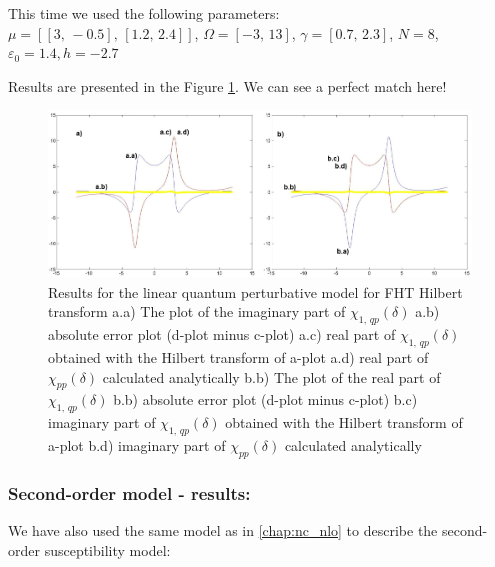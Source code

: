 \documentclass[12pt,twoside,a4paper]{article}
\numberwithin{equation}{subsection}
\numberwithin{figure}{subsection}
\begin{document}
This time we used the following parameters: \\
$\mu = [[3, \, - 0.5], \,[1.2, \,2.4]]$, 
$\Omega =[ - 3, \,13]$, 
$\gamma =[0.7, \,2.3]$,  
$N=8$, 
${\varepsilon_{0}}=1.4, 
h= - 2.7$

Results are presented in the Figure \ref{fig:fht_qp1}. We can see a perfect match here!

\begin{figure}
  \includegraphics[width=150mm]{img/fht_qp1.png}
  \caption{Results for the linear quantum perturbative model for FHT Hilbert transform
    a.a) The plot of the imaginary part of ${\chi_{1, \,qp}}(\delta )$
    a.b) absolute error plot (d-plot minus c-plot) 
    a.c) real part of ${\chi_{1, \,qp}}(\delta )$ obtained with the Hilbert transform of a-plot 
    a.d) real part of ${\chi_{pp}}(\delta )$ calculated analytically 
    b.b) The plot of the real part of ${\chi_{1, \,qp}}(\delta )$ 
    b.b) absolute error plot (d-plot minus c-plot) 
    b.c) imaginary part of ${\chi_{1, \,qp}}(\delta )$ obtained with the Hilbert transform of a-plot 
    b.d) imaginary part of ${\chi_{pp}}(\delta )$ calculated analytically  
    \label{fig:fht_qp1}
  }
\end{figure}

\subsubsection*{Second-order model - results:}

We have also used the same model as in \ref{chap:nc_nlo} to describe the second-order susceptibility model:
\end{document}
